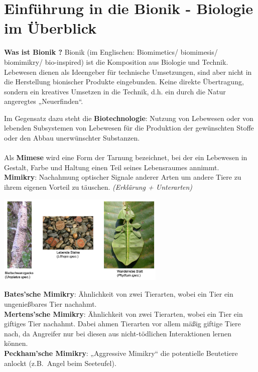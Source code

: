 \section{Einführung in die Bionik - Biologie im Überblick}

\textbf{Was ist Bionik \dangersign?} Bionik (im Englischen: Biomimetics/ biomimesis/ biomimikry/ bio-inspired) ist die Komposition aus Biologie und Technik. Lebewesen dienen als Ideengeber für technische Umsetzungen, sind aber nicht in die Herstellung bionischer Produkte eingebunden. Keine direkte Übertragung, sondern ein kreatives Umsetzen in die Technik, d.h. ein durch die Natur angeregtes „Neuerfinden“.

Im Gegensatz dazu steht die \textbf{Biotechnologie}: Nutzung von Lebewesen oder von lebenden Subsystemen von Lebewesen für die Produktion der gewünschten Stoffe oder den Abbau unerwünschter Substanzen.
\\\\
Als \textbf{Mimese} wird eine Form der Tarnung bezeichnet, bei der ein Lebewesen in Gestalt, Farbe und Haltung einen Teil seines Lebensraumes annimmt. \dangersign
\\
\textbf{Mimikry}: Nachahmung optischer Signale anderer Arten um andere Tiere zu ihrem eigenen Vorteil zu täuschen. \dangersign \textit{(Erklärung + Unterarten)}

\begin{center}
	\includegraphics[width=8cm]{lec1/figures/Mimese.png}	
\end{center}
\textbf{Bates'sche Mimikry}: Ähnlichkeit von zwei Tierarten, wobei ein Tier ein ungenießbares Tier nachahmt.\\
\textbf{Mertens'sche Mimikry}: Ähnlichkeit von zwei Tierarten, wobei ein Tier ein giftiges Tier nachahmt. Dabei ahmen Tierarten vor allem mäßig giftige Tiere nach, da Angreifer nur bei diesen aus nicht-tödlichen Interaktionen lernen können.\\
\textbf{Peckham'sche Mimikry}: „Aggressive Mimikry“ die potentielle Beutetiere anlockt (z.B.\ Angel beim Seeteufel).


